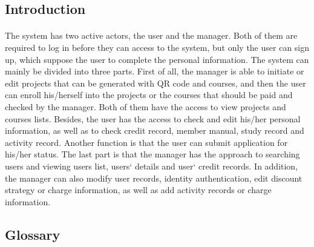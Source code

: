\documentclass[12pt]{report}
\begin{document}
\subsection{Introduction}
\paragraph{}
The system has two active actors, the user and the manager. Both of them are required to log in before they can access to the system, but only the user can sign up, which suppose the user to complete the personal information. 
The system can mainly be divided into three parts. First of all, the manager is able to initiate or edit projects that can be generated with QR code and courses, and then the user can enroll his/herself into the projects or the courses that should be paid and checked by the manager. Both of them have the access to view projects and courses lists. Besides, the user has the access to check and edit his/her personal information, as well as to check credit record, member manual, study record and activity record. Another function is that the user can submit application for his/her status. The last part is that the manager has the approach to searching users and viewing users list, users` details and user` credit records. In addition, the manager can also modify user records, identity authentication, edit discount strategy or charge information, as well as add activity records or charge information.

\subsection{Glossary}
\paragraph{}
\end{document}
